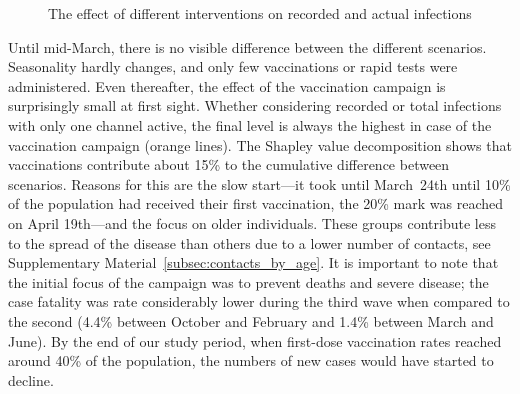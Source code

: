 \begin{figure}[!tp]
    \caption{The effect of different interventions on recorded and actual infections}
    \label{fig:2021_scenarios_broad}

\end{figure}

Until mid-March, there is no visible difference between the different scenarios.
Seasonality hardly changes, and only few vaccinations or rapid tests were administered.
Even thereafter, the effect of the vaccination campaign is surprisingly small at first
sight. Whether considering recorded or total infections with only one channel active,
the final level is always the highest in case of the vaccination campaign (orange
lines). The Shapley value decomposition shows that vaccinations contribute about 15\% to
the cumulative difference between scenarios. Reasons for this are the slow start---it
took until March~24th until 10\% of the population had received their first vaccination,
the 20\% mark was reached on April 19th---and the focus on older individuals. These
groups contribute less to the spread of the disease than others due to a lower number of
contacts, see Supplementary Material~\ref{subsec:contacts_by_age}. It is important to
note that the initial focus of the campaign was to prevent deaths and severe disease;
the case fatality was rate considerably lower during the third wave when compared to the
second (4.4\% between October and February and 1.4\% between March and June). By the end
of our study period, when first-dose vaccination rates reached around 40\% of the
population, the numbers of new cases would have started to decline.

